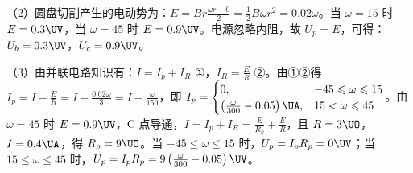 \documentclass[\gkver]{gaokaozhenti}
\begin{document}
\begin{enumerate}
{（2）圆盘切割产生的电动势为：$E=Br\frac{\omega r+0}{2}=\frac{1}{2}B\omega r^{2}=0.02\omega$。当 $\omega=15$ 时 $E=0.3\UV$，当 $\omega=45$ 时 $E=0.9\UV$。电源忽略内阻，故 $U_{p}=E$，可得：$U_{b}=0.3\UV$，$U_{c}=0.9\UV$。

（3）由并联电路知识有：$I=I_{p}+I_{R}$ ①，$I_{R}=\frac{E}{R}$ ②。由①②得 $I_{p}=I-\frac{E}{R}=I-\frac{0.02\omega}{3}=I-\frac{\omega}{150}$，即 $I_{p}=\begin{cases}0, & -45\leqslant\omega\leqslant 15\\ \left(\frac{\omega}{300}-0.05\right)\UA, & 15<\omega\leqslant 45\end{cases}$。由 $\omega=45$ 时 $E=0.9\UV$，C 点导通，$I=I_{p}+I_{R}=\frac{E}{R_{p}}+\frac{E}{R}$，且 $R=3\UO$，$I=0.4\UA$，得 $R_{p}=9\UO$。当 $-45\leqslant\omega\leqslant 15$ 时，$U_{p}=I_{p}R_{p}=0\UV$；当 $15\leqslant\omega\leqslant 45$ 时，$U_{p}=I_{p}R_{p}=9\left(\frac{\omega}{300}-0.05\right)\UV$。
}

\end{enumerate}
\end{document}
